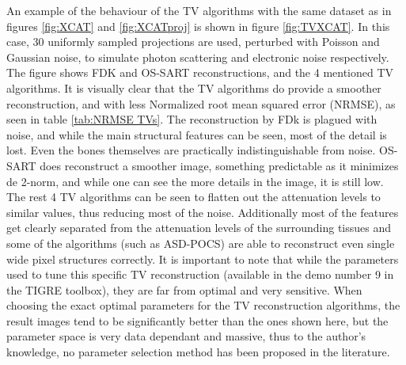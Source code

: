 An example of the behaviour of the TV algorithms with the same dataset as in figures \ref{fig:XCAT} and \ref{fig:XCATproj} is shown in figure \ref{fig:TVXCAT}. In this case, 30 uniformly sampled projections are used, perturbed with Poisson and Gaussian noise, to simulate photon scattering and electronic noise respectively. The figure shows FDK and OS-SART reconstructions, and the 4 mentioned TV algorithms. It is visually clear that the TV algorithms do provide a smoother reconstruction, and with less Normalized root mean squared error (NRMSE), as seen in table \ref{tab:NRMSE TVs}.
The reconstruction by FDk is plagued with noise, and while the main structural features can be seen, most of the detail is lost. Even the bones themselves are practically indistinguishable from noise. OS-SART does reconstruct a smoother image, something predictable as it minimizes de 2-norm, and while one can see the more details in the image, it is still low. The rest 4 TV algorithms can be seen to flatten out the attenuation levels to similar values, thus reducing most of the noise. Additionally most of the features get clearly separated from the attenuation levels of the surrounding tissues and some of the algorithms (such as ASD-POCS) are able to reconstruct even single wide pixel structures correctly. It is important to note that while the parameters used to tune this specific TV reconstruction (available in the demo number 9 in the TIGRE toolbox), they are far from optimal and very sensitive\cite{Vee}. When choosing the exact optimal parameters for the TV reconstruction algorithms, the result images tend to be significantly better than the ones shown here, but the parameter space is very data dependant and massive, thus to the author's knowledge, no parameter selection method has been proposed in the literature. 


